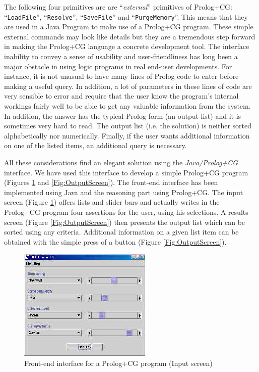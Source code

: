 \documentclass{book}
\begin{document}
The following four primitives are are ``{\em external}'' primitives of
Prolog+CG: ``\texttt{LoadFile}'', ``\texttt{Resolve}'',
``\texttt{SaveFile}'' and ``\texttt{PurgeMemory}''.  This means that
they are used in a Java Program to make use of a Prolog+CG
program. These simple external commands may look like details but they
are a tremendous step forward in making the Prolog+CG language a
concrete development tool. The interface inability to convey a sense
of usability and user-friendliness has long been a major obstacle in
using logic programs in real end-user developments.  For instance, it
is not unusual to have many lines of Prolog code to enter before
making a useful query. In addition, a lot of parameters in these lines
of code are very sensible to error and require that the user know the
program's internal workings fairly well to be able to get any valuable
information from the system. In addition, the answer has the typical
Prolog form (an output list) and it is sometimes very hard to
read. The output list (i.e. the solution) is neither sorted
alphabetically nor numerically. Finally, if the user wants additional
information on one of the listed items, an additional query is
necessary.

All these considerations find an elegant solution using the {\it
Java/Prolog+CG} interface. We have used this interface to develop a
simple Prolog+CG program (Figures \ref{Fig:InputScreen} and
\ref{Fig:OutputScreen}).  The front-end interface has been implemented
using Java and the reasoning part using Prolog+CG. The input screen
(Figure \ref{Fig:InputScreen}) offers lists and slider bars and
actually writes in the Prolog+CG program four assertions for the user,
using his selections. A results-screen (Figure \ref{Fig:OutputScreen})
then presents the output list which can be sorted using any
criteria. Additional information on a given list item can be obtained
with the simple press of a button (Figure \ref{Fig:OutputScreen}).

\begin{latexonly}

\begin{figure}
\begin{center}
\includegraphics[scale=0.2]{Prolog1.jpg}
\end{center}
\caption{\label{Fig:InputScreen}Front-end interface for a Prolog+CG
program (Input screen)}
\end{figure}

\end{latexonly}
\end{document}
